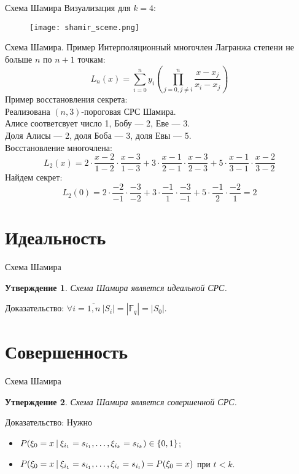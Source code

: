 \documentclass{beamer}
\newtheorem{claim}{Утверждение}
\begin{document}
\begin{frame}{Схема Шамира}
    Визуализация для \(k = 4\):
    \begin{figure}
    \centering
    \texttt{[image: shamir\_sceme.png]}
\end{figure}
\end{frame}

\begin{frame}{Схема Шамира. Пример}
    Интерполяционный многочлен Лагранжа степени не больше \(n\) по \(n + 1\) точкам: \[L_n(x) = \sum_{i = 0}^n y_i \left( \prod_{j = 0, j \neq i}^n \frac{x - x_j}{x_i - x_j}\right)\]
    Пример восстановления секрета:\\ Реализована \((n, 3)\)-пороговая СРС Шамира. \\
    Алисе соответсвует число 1, Бобу --- 2, Еве --- 3. \\
    Доля Алисы --- 2, доля Боба --- 3, доля Евы --- 5. \\
    Восстановление многочлена: \[L_2(x) = 2 \cdot \frac{x - 2}{1 - 2} \cdot \frac{x - 3}{1 - 3} + 3 \cdot \frac{x - 1}{2 - 1} \cdot \frac{x - 3}{2 - 3} + 5 \cdot \frac{x - 1}{3 - 1} \cdot \frac{x - 2}{3 - 2} \]
    Найдем секрет: \[
        L_2(0) = 2 \cdot \frac{-2}{-1} \cdot \frac{-3}{-2} + 3 \cdot \frac{-1}{1} \cdot \frac{-3}{-1} + 5 \cdot \frac{-1}{2} \cdot \frac{-2}{1} = 2
    \]
    
    
\end{frame}

\section{Идеальность}
\begin{frame}{Схема Шамира}
    \begin{claim}
        Схема Шамира является идеальной СРС.
    \end{claim}
    Доказательство: \(\forall i = \overline{1, n} \ |S_i| = |\mathbb{F}_q| = |S_0|\).
\end{frame}

\section{Совершенность}
\begin{frame}{Схема Шамира}
    \begin{claim}
        Схема Шамира является совершенной СРС.
    \end{claim}
    Доказательство: Нужно
    \begin{itemize}
        \item \(P(\xi_0 = x \ \vline \ \xi_{i_1} = s_{i_1}, \dots, \xi_{i_k} = s_{i_k}) \in \{ 0, 1 \} \); \\
        \item \(P(\xi_0 = x \ \vline \ \xi_{i_1} = s_{i_1}, \dots, \xi_{i_t} = s_{i_t}) = P(\xi_0 = x) \) при \(t < k\).
    \end{itemize}
\end{frame}
\end{document}
